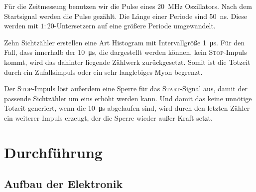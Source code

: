 \documentclass[11pt, ngerman, fleqn, DIV=15, headinclude, BCOR=2cm]{scrreprt}
\begin{document}
Für die Zeitmessung benutzen wir die Pulse eines \SI{20}{\mega\hertz}
Oszillators. Nach dem Startsignal werden die Pulse gezählt. Die Länge einer
Periode sind \SI{50}{\nano\second}. Diese werden mit $1:20$-Untersetzern
auf eine größere Periode umgewandelt.

Zehn Sichtzähler erstellen eine Art Histogram mit Intervallgröße
\SI{1}{\micro\second}. Für den Fall, dass innerhalb der \SI{10}{\micro\second},
die dargestellt werden können, kein \textsc{Stop}-Impuls kommt, wird das
dahinter liegende Zählwerk zurückgesetzt. Somit ist die Totzeit durch ein
Zufallsimpuls oder ein sehr langlebiges Myon begrenzt.

Der \textsc{Stop}-Impuls löst außerdem eine Sperre für das
\textsc{Start}-Signal aus, damit der passende Sichtzähler um eins erhöht werden
kann. Und damit das keine unnötige Totzeit generiert, wenn die
\SI{10}{\micro\second} abgelaufen sind, wird durch den letzten Zähler ein
weiterer Impuls erzeugt, der die Sperre wieder außer Kraft setzt.

\section{Durchführung}

\subsection{Aufbau der Elektronik}
\end{document}
